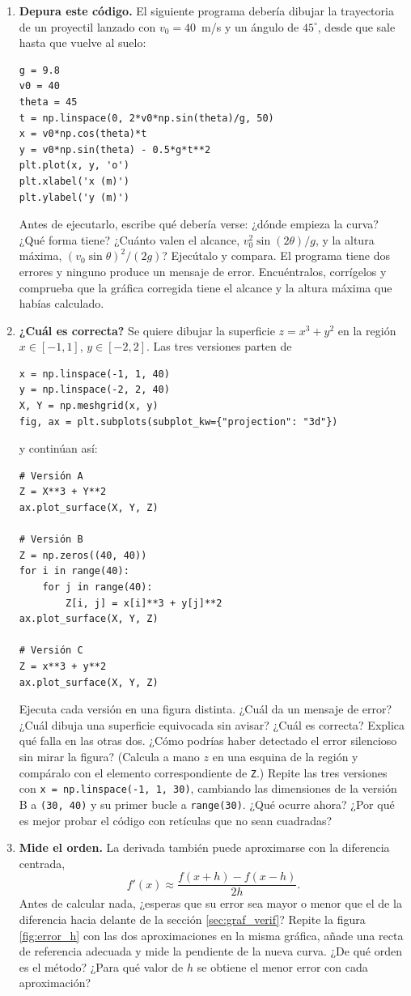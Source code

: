 \begin{enumerate}
\item \textbf{Depura este código.} El siguiente programa debería dibujar la trayectoria de un proyectil lanzado con $v_0=40$~m/s y un ángulo de $45^\circ$, desde que sale hasta que vuelve al suelo:
\begin{verbatim}
g = 9.8
v0 = 40
theta = 45
t = np.linspace(0, 2*v0*np.sin(theta)/g, 50)
x = v0*np.cos(theta)*t
y = v0*np.sin(theta) - 0.5*g*t**2
plt.plot(x, y, 'o')
plt.xlabel('x (m)')
plt.ylabel('y (m)')
\end{verbatim}
Antes de ejecutarlo, escribe qué debería verse: ¿dónde empieza la curva? ¿Qué forma tiene? ¿Cuánto valen el alcance, $v_0^2\sin(2\theta)/g$, y la altura máxima, $(v_0\sin\theta)^2/(2g)$? Ejecútalo y compara. El programa tiene dos errores y ninguno produce un mensaje de error. Encuéntralos, corrígelos y comprueba que la gráfica corregida tiene el alcance y la altura máxima que habías calculado.

\item\label{ej:mesh_cual} \textbf{¿Cuál es correcta?} Se quiere dibujar la superficie $z=x^3+y^2$ en la región $x\in[-1,1]$, $y\in[-2,2]$. Las tres versiones parten de
\begin{verbatim}
x = np.linspace(-1, 1, 40)
y = np.linspace(-2, 2, 40)
X, Y = np.meshgrid(x, y)
fig, ax = plt.subplots(subplot_kw={"projection": "3d"})
\end{verbatim}
y continúan así:
\begin{verbatim}
# Versión A
Z = X**3 + Y**2
ax.plot_surface(X, Y, Z)

# Versión B
Z = np.zeros((40, 40))
for i in range(40):
    for j in range(40):
        Z[i, j] = x[i]**3 + y[j]**2
ax.plot_surface(X, Y, Z)

# Versión C
Z = x**3 + y**2
ax.plot_surface(X, Y, Z)
\end{verbatim}
Ejecuta cada versión en una figura distinta. ¿Cuál da un mensaje de error? ¿Cuál dibuja una superficie equivocada sin avisar? ¿Cuál es correcta? Explica qué falla en las otras dos. ¿Cómo podrías haber detectado el error silencioso sin mirar la figura? (Calcula a mano $z$ en una esquina de la región y compáralo con el elemento correspondiente de \texttt{Z}.) Repite las tres versiones con \texttt{x = np.linspace(-1, 1, 30)}, cambiando las dimensiones de la versión B a \texttt{(30, 40)} y su primer bucle a \texttt{range(30)}. ¿Qué ocurre ahora? ¿Por qué es mejor probar el código con retículas que no sean cuadradas?

\item \textbf{Mide el orden.} La derivada también puede aproximarse con la diferencia centrada,
$$f'(x)\approx\frac{f(x+h)-f(x-h)}{2h}.$$
Antes de calcular nada, ¿esperas que su error sea mayor o menor que el de la diferencia hacia delante de la sección \ref{sec:graf_verif}? Repite la figura \ref{fig:error_h} con las dos aproximaciones en la misma gráfica, añade una recta de referencia adecuada y mide la pendiente de la nueva curva. ¿De qué orden es el método? ¿Para qué valor de $h$ se obtiene el menor error con cada aproximación?


\end{enumerate}

